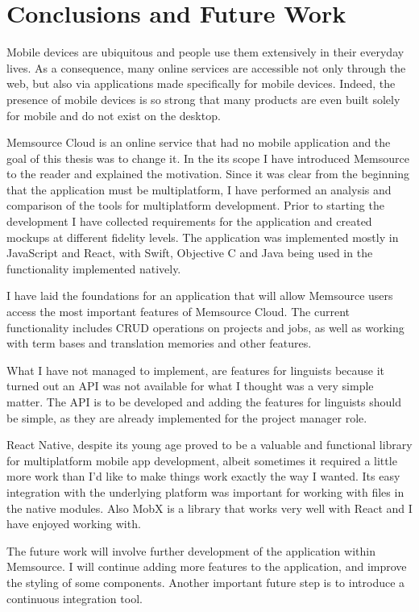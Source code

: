 \chapter{Conclusions and Future Work}

Mobile devices are ubiquitous and people use them extensively in their everyday lives. As a consequence, many online services are accessible not only through the web, but also via applications made specifically for mobile devices. Indeed, the presence of mobile devices is so strong that many products are even built solely for mobile and do not exist on the desktop.

Memsource Cloud is an online service that had no mobile application and the goal of this thesis was to change it. In the its scope I have introduced Memsource to the reader and explained the motivation. Since it was clear from the beginning that the application must be multiplatform, I have performed an analysis and comparison of the tools for multiplatform development. Prior to starting the development I have collected requirements for the application and created mockups at different fidelity levels. The application was implemented mostly in JavaScript and React, with Swift, Objective C and Java being used in the functionality implemented natively. 

I have laid the foundations for an application that will allow Memsource users access the most important features of Memsource Cloud. The current functionality includes CRUD operations on projects and jobs, as well as working with term bases and translation memories and other features.

What I have not managed to implement, are features for linguists because it turned out an API was not available for what I thought was a very simple matter. The API is to be developed and adding the features for linguists should be simple, as they are already implemented for the project manager role.

React Native, despite its young age proved to be a valuable and functional library for multiplatform mobile app development, albeit sometimes it required a little more work than I'd like to make things work exactly the way I wanted. Its easy integration with the underlying platform was important for working with files in the native modules. Also MobX is a library that works very well with React and I have enjoyed working with.


The future work will involve further development of the application within Memsource. I will continue adding more features to the application, and improve the styling of some components. Another important future step is to introduce a continuous integration tool.